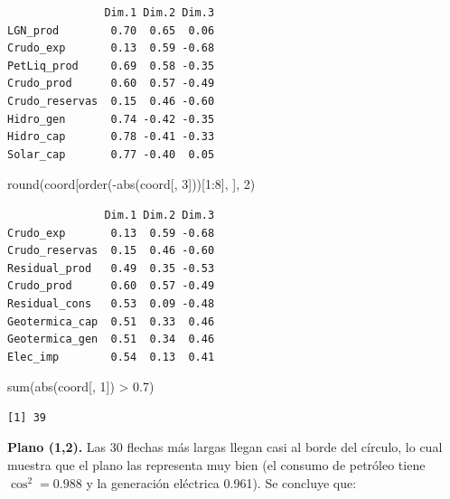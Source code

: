 \documentclass[oneside, openany, fontset=libertinus]{mitthesis}
\newenvironment{Shaded}{\begin{snugshade}}{\end{snugshade}}
\newcommand{\DecValTok}[1]{\textcolor[rgb]{0.68,0.00,0.00}{#1}}
\newcommand{\FloatTok}[1]{\textcolor[rgb]{0.68,0.00,0.00}{#1}}
\newcommand{\FunctionTok}[1]{\textcolor[rgb]{0.28,0.35,0.67}{#1}}
\newcommand{\NormalTok}[1]{\textcolor[rgb]{0.00,0.23,0.31}{#1}}
\newcommand{\SpecialCharTok}[1]{\textcolor[rgb]{0.37,0.37,0.37}{#1}}
\newenvironment{codres}%
  {\par\smallskip\noindent\begin{minipage}[t]{0.57\linewidth}\vspace{0pt}}%
  {\end{minipage}\par\medskip}
\newcommand{\codressep}{\end{minipage}\hfill\begin{minipage}[t]{0.40\linewidth}\vspace{0pt}}
\begin{document}
\begin{verbatim}
               Dim.1 Dim.2 Dim.3
LGN_prod        0.70  0.65  0.06
Crudo_exp       0.13  0.59 -0.68
PetLiq_prod     0.69  0.58 -0.35
Crudo_prod      0.60  0.57 -0.49
Crudo_reservas  0.15  0.46 -0.60
Hidro_gen       0.74 -0.42 -0.35
Hidro_cap       0.78 -0.41 -0.33
Solar_cap       0.77 -0.40  0.05
\end{verbatim}

\Needspace{1.90in}

\begin{Shaded}
\begin{Highlighting}[]
\FunctionTok{round}\NormalTok{(coord[}\FunctionTok{order}\NormalTok{(}\SpecialCharTok{{-}}\FunctionTok{abs}\NormalTok{(coord[, }\DecValTok{3}\NormalTok{]))[}\DecValTok{1}\SpecialCharTok{:}\DecValTok{8}\NormalTok{], ], }\DecValTok{2}\NormalTok{)}
\end{Highlighting}
\end{Shaded}

\begin{verbatim}
               Dim.1 Dim.2 Dim.3
Crudo_exp       0.13  0.59 -0.68
Crudo_reservas  0.15  0.46 -0.60
Residual_prod   0.49  0.35 -0.53
Crudo_prod      0.60  0.57 -0.49
Residual_cons   0.53  0.09 -0.48
Geotermica_cap  0.51  0.33  0.46
Geotermica_gen  0.51  0.34  0.46
Elec_imp        0.54  0.13  0.41
\end{verbatim}

\Needspace{0.95in}

\begin{codres}

\begin{Shaded}
\begin{Highlighting}[]
\FunctionTok{sum}\NormalTok{(}\FunctionTok{abs}\NormalTok{(coord[, }\DecValTok{1}\NormalTok{]) }\SpecialCharTok{\textgreater{}} \FloatTok{0.7}\NormalTok{)}
\end{Highlighting}
\end{Shaded}

\codressep

\begin{verbatim}
[1] 39
\end{verbatim}

\end{codres}

\textbf{Plano (1,2).} Las 30 flechas más largas llegan casi al borde del
círculo, lo cual muestra que el plano las representa muy bien (el
consumo de petróleo tiene \(\cos^2 = 0.988\) y la generación eléctrica
0.961). Se concluye que:
\end{document}
